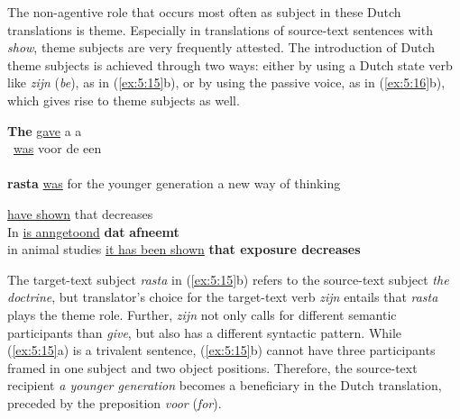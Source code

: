 \documentclass[output=paper]{LSP/langsci}
\begin{document}
 
The non-agentive role that occurs most often as subject in these Dutch translations is theme. Especially in translations of source-text sentences with \textit{show}, theme subjects are very frequently attested. The introduction of Dutch theme subjects is achieved through two ways: either by using a Dutch state verb like \textit{zijn} (\textit{be}), as in (\ref{ex:5:15}b), or by using the passive voice, as in (\ref{ex:5:16}b), which gives rise to theme subjects as well.

\newpage

\ea \label{ex:5:15} 
\ea
\textbf{The}  \ul{gave} a  a\\\, 
\ex {} \ul{was} voor de  een\\\, \\[1em]
\textbf{rasta} \ul{was} for the younger generation a new way of thinking
\z
\z


\ea \label{ex:5:16}
\ea {} \ul{have shown} that  decreases\\[1em]
\ex
In  \ul{is anngetoond} \textbf{dat}  \textbf{afneemt}\\
in animal studies \ul{it has been shown} \textbf{that exposure decreases}
\z
\z



The target-text subject \textit{rasta} in (\ref{ex:5:15}b) refers to the source-text subject \textit{the doctrine}, but translator’s choice for the target-text verb \textit{zijn} entails that \textit{rasta} plays the theme role. Further, \textit{zijn} not only calls for different semantic participants than \textit{give}, but also has a different syntactic pattern. While (\ref{ex:5:15}a) is a trivalent sentence, (\ref{ex:5:15}b) cannot have three participants framed in one subject and two object positions. Therefore, the source-text recipient \textit{a younger generation} becomes a beneficiary in the Dutch translation, preceded by the preposition \textit{voor} (\textit{for}).
\end{document}
